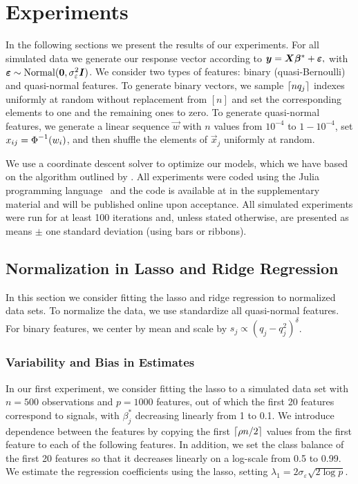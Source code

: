 \section{Experiments}

In the following sections we present the results of our experiments. For all simulated data
we generate our response vector according to \(\bm{y} = \bm{X}\bm{\beta}^* +
\bm{\varepsilon},\) with \(\bm{\varepsilon} \sim \operatorname{Normal}(\bm{0}, \sigma_\varepsilon^2
\bm{I})\). We consider two types of features: binary (quasi-Bernoulli) and quasi-normal
features. To generate binary vectors, we sample \(\lceil nq_j \rceil\) indexes uniformly at random
without replacement from \([n]\) and set the corresponding elements to one and the
remaining ones to zero. To generate quasi-normal features, we generate a linear sequence
\(\vec{w}\) with \(n\) values from \(10^{-4}\) to \(1 - 10^{-4}\), set \(x_{ij} =
\operatorname{\Phi}^{-1}(w_i)\), and then shuffle the elements of \(\vec{x}_j\) uniformly at random.

We use a coordinate descent solver to optimize our models, which we have based on the
algorithm outlined by \citet{friedman2010}. All experiments were coded using the Julia
programming language~\citep{bezanson2017} and the code is available at
in the supplementary material and will be published online upon acceptance.
%
All simulated experiments were run for at least 100 iterations and, unless stated
otherwise, are presented as means $\pm$ one standard deviation (using bars or ribbons).

\subsection{Normalization in Lasso and Ridge Regression}%
\label{sec:experiments-lassoridge}

In this section we consider fitting the lasso and ridge regression to normalized data sets.
To normalize the data, we use standardize all quasi-normal features. For binary features,
we center by mean and scale by \(s_j \propto (q_j-q_j^2)^\delta\).

\subsubsection{Variability and Bias in Estimates}

In our first experiment, we consider fitting the lasso to a simulated data set with
\(n=500\) observations and \(p = \num{1000}\) features, out of which the first 20 features
correspond to signals, with \(\beta_j^*\) decreasing linearly from 1 to 0.1. We introduce
dependence between the features by copying the first \(\lceil \rho n/2 \rceil\) values from the
first feature to each of the following features. In addition, we set the class balance of
the first 20 features so that it decreases linearly on a log-scale from 0.5 to 0.99. We
estimate the regression coefficients using the lasso, setting \(\lambda_1 = 2
\sigma_\varepsilon \sqrt{2 \log p }\).

